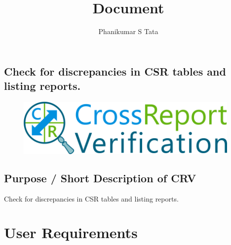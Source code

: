 \documentclass[
  letterpaper,
  DIV=11,
  numbers=noendperiod]{scrartcl}
\title{Document}
\author{Phanikumar S Tata}
\date{}
\renewcommand*\contentsname{Table of contents}
\newcommand\contentsname{Table of contents}
\begin{document}
\maketitle
\ifdefined\Shaded\renewenvironment{Shaded}{\begin{tcolorbox}[sharp corners, interior hidden, boxrule=0pt, frame hidden, enhanced, breakable, borderline west={3pt}{0pt}{shadecolor}]}{\end{tcolorbox}}\fi

\renewcommand*\contentsname{Table of contents}
{
\hypersetup{linkcolor=}
\setcounter{tocdepth}{3}
\tableofcontents
}
\hypertarget{check-for-discrepancies-in-csr-tables-and-listing-reports.}{%
\subsection{Check for discrepancies in CSR tables and listing
reports.}\label{check-for-discrepancies-in-csr-tables-and-listing-reports.}}

\begin{figure}

{\centering \includegraphics[width=4.29167in,height=\textheight]{image/Picture1.png}

}

\end{figure}

\hypertarget{purpose-short-description-of-crv}{%
\subsection{Purpose / Short Description of
CRV}\label{purpose-short-description-of-crv}}

Check for discrepancies in CSR tables and listing reports.~

\hypertarget{user-requirements}{%
\section{User Requirements}\label{user-requirements}}
\end{document}
